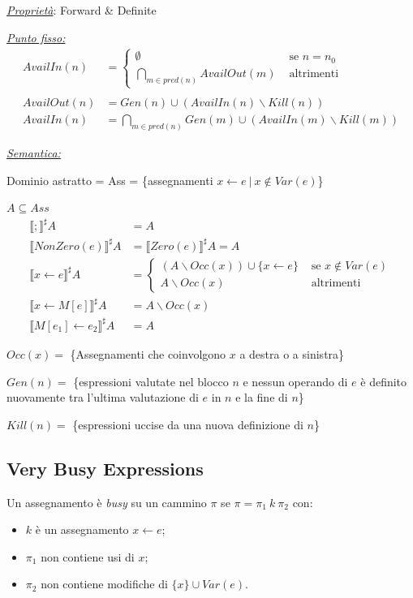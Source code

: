 \documentclass[a4paper, 10pt]{book}
\begin{document}
\noindent
\textit{\underline{Proprietà}}: Forward \& Definite
\newline

\noindent
\underline{\textit{Punto fisso:}}
\begin{align*}
	AvailIn(n) &= 
	\begin{cases}
		\emptyset &\text{ se } n = n_0 \\
		\bigcap_{m\in pred(n)} AvailOut(m) &\text{ altrimenti}
	\end{cases}\\ \\
	AvailOut(n) &= Gen(n) \cup (AvailIn(n)\backslash Kill(n))\\
	AvailIn(n) &= \bigcap_{m\in pred(n)} Gen(m) \cup (AvailIn(m)\backslash Kill(m))
\end{align*}

\noindent
\underline{\textit{Semantica:}}

Dominio astratto = Ass = \{assegnamenti $x\leftarrow e ~|~ x\notin Var(e)$\}

$A\subseteq Ass$
\begin{align*}
	\llbracket ; \rrbracket^\sharp A &= A\\
	\llbracket NonZero(e) \rrbracket^\sharp A &= \llbracket Zero(e) \rrbracket^\sharp A = A\\
	\llbracket x\leftarrow e \rrbracket^\sharp A &= \begin{cases}
		(A\backslash Occ(x)) \cup \{x\leftarrow e \} &\text{ se } x\notin Var(e) \\
		A\backslash Occ(x) &\text{ altrimenti}
	\end{cases}\\
	\llbracket x\leftarrow M[e] \rrbracket^\sharp A &= A\backslash Occ(x)\\
	\llbracket M[e_1]\leftarrow e_2 \rrbracket^\sharp A &= A
\end{align*}

$Occ(x) = $ \{Assegnamenti che coinvolgono $x$ a destra o a sinistra\}

$Gen(n) = $ \{espressioni valutate nel blocco $n$ e nessun operando di $e$ è definito nuovamente tra l'ultima valutazione di $e$ in $n$ e la fine di $n$\}

$Kill(n) = $ \{espressioni uccise da una nuova definizione di $n$\}

\noindent


\newpage
\subsection{Very Busy Expressions}
Un assegnamento è \textit{busy} su un cammino $\pi$ se $\pi = \pi_1 ~k~ \pi_2$ con:
\begin{itemize}
	\item $k$ è un assegnamento $x\leftarrow e$;
	\item $\pi_1$ non contiene usi di $x$;
	\item $\pi_2$ non contiene modifiche di $\{x\}\cup Var(e)$.
\end{itemize}
\end{document}
